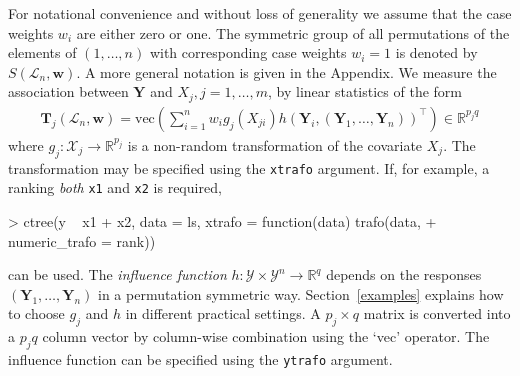 \documentclass{Z}
\newcommand{\R}{\mathbb{R} }
\newcommand{\LS}{\mathcal{L}_n}
\newcommand{\Y}{\mathbf{Y}}
\newcommand{\sX}{\mathcal{X}}
\newcommand{\sY}{\mathcal{Y}}
\newcommand{\T}{\mathbf{T}}
\newcommand{\w}{\mathbf{w}}
\renewcommand{\vec}{\text{vec}}
\begin{document}
For notational convenience and without loss of generality we assume that the
case weights $w_i$ are either zero or one. The symmetric group of all
permutations of  the elements of $(1, \dots, n)$ with corresponding case
weights $w_i = 1$ is denoted by $S(\LS, \w)$. A more general notation is
given in the Appendix. We measure the association between $\Y$ and $X_j, j = 1, \dots, m$, 
by linear statistics of the form
\begin{eqnarray} \label{linstat}
\T_j(\LS, \w) = \vec \left( \sum_{i=1}^n w_i g_j(X_{ji})
h(\Y_i, (\Y_1, \dots, \Y_n))^\top \right) \in \R^{p_jq}
\end{eqnarray}
where $g_j: \sX_j \rightarrow \R^{p_j}$ is a non-random transformation of
the covariate $X_j$. The transformation may be specified using the
\texttt{xtrafo} argument. If, for example, a ranking \textit{both}
\texttt{x1} and \texttt{x2} is required,
\begin{Schunk}
\begin{Sinput}
> ctree(y ~ x1 + x2, data = ls, xtrafo = function(data) trafo(data, 
+     numeric_trafo = rank))
\end{Sinput}
\end{Schunk}
can be used. The \emph{influence function} 
$h: \sY \times \sY^n \rightarrow
\R^q$ depends on the responses $(\Y_1, \dots, \Y_n)$ in a permutation
symmetric way. 
Section~\ref{examples} explains how to choose $g_j$ and $h$ in different 
practical settings. A $p_j \times q$ matrix is converted into a 
$p_jq$ column vector by column-wise combination using the `vec' operator. 
The influence function can be specified using the \texttt{ytrafo} argument.
\end{document}
